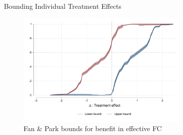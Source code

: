 \documentclass[8pt]{beamer}
\begin{document}
\begin{frame}{Bounding Individual Treatment Effects}
\label{fan_park_bounds}    

\begin{figure}[H]
    \caption{Fan \& Park bounds for benefit in effective FC }
    
    \begin{center}
        \includegraphics[width=0.75\textwidth]{Figuras/fan_park_bounds_fc_admin.pdf}
    \end{center}
   
\end{figure}
 \hyperlink{choice_hte}{}
\end{frame}


 
 
\end{document}
